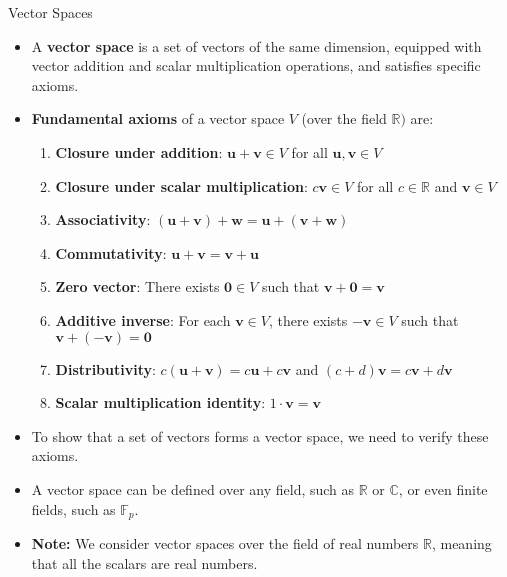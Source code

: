 \begin{frame}{Vector Spaces}
\begin{itemize}
    \item A \textbf{vector space} is a set of vectors of the same dimension, equipped with vector addition and scalar multiplication operations, and satisfies specific axioms.
    \item \textbf{Fundamental axioms } of a vector space $V$ (over the field $\mathbb{R})$ are:
        \begin{enumerate}
            \item \textbf{Closure under addition}: $\mathbf{u} + \mathbf{v} \in V$ for all $\mathbf{u}, \mathbf{v} \in V$
            \item \textbf{Closure under scalar multiplication}: $c\mathbf{v} \in V$ for all $c \in \mathbb{R}$ and $\mathbf{v} \in V$
            \item \textbf{Associativity}: $(\mathbf{u} + \mathbf{v}) + \mathbf{w} = \mathbf{u} + (\mathbf{v} + \mathbf{w})$
            \item \textbf{Commutativity}: $\mathbf{u} + \mathbf{v} = \mathbf{v} + \mathbf{u}$
            \item \textbf{Zero vector}: There exists $\mathbf{0} \in V$ such that $\mathbf{v} + \mathbf{0} = \mathbf{v}$
            \item \textbf{Additive inverse}: For each $\mathbf{v} \in V$, there exists $-\mathbf{v} \in V$ such that $\mathbf{v} + (-\mathbf{v}) = \mathbf{0}$
            \item \textbf{Distributivity}: $c(\mathbf{u} + \mathbf{v}) = c\mathbf{u} + c\mathbf{v}$ and $(c + d)\mathbf{v} = c\mathbf{v} + d\mathbf{v}$
            \item \textbf{Scalar multiplication identity}: $1 \cdot \mathbf{v} = \mathbf{v}$
        \end{enumerate}
\end{itemize}
\end{frame}
\begin{frame}
    \begin{itemize}
        \item To show that a set of vectors forms a vector space, we need to verify these axioms.
        \item A vector space can be defined over any field, such as $\mathbb{R}$ or $\mathbb{C}$, or even finite fields, such as $\mathbb{F}_p$.
        \item  \textbf{Note:} We consider vector spaces over the field of real numbers $\mathbb{R}$, meaning that all the scalars are real numbers.
    \end{itemize}
\end{frame}
